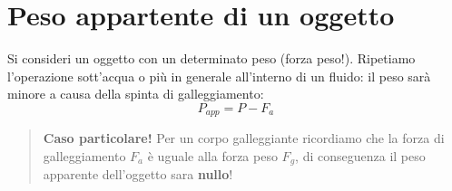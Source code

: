     \section{Peso appartente di un oggetto} Si consideri un oggetto con un 
    determinato peso (forza peso!). Ripetiamo l'operazione sott'acqua o più in 
    generale all'interno di un fluido: il peso sarà minore a causa della spinta
    di galleggiamento:
        \begin{equation}
            P_{app} = P - F_a
        \end{equation}
        \begin{quote}
            \textbf{Caso particolare!} Per un corpo galleggiante ricordiamo che
            la forza di galleggiamento $F_a$ è uguale alla forza peso $F_g$, di
            conseguenza il peso apparente dell'oggetto sara \textbf{nullo}!
        \end{quote}
            